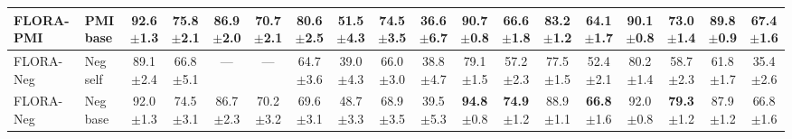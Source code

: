 \documentclass[10pt]{article}
\newcommand{\stdv}[1]{{\tiny$\pm$#1}}
\begin{document}
\begin{center}
{\begin{tabular}{ll cccc cccc cccc cccc}
FLORA-PMI & PMI base & 92.6\stdv{1.3} & 75.8\stdv{2.1} & 86.9\stdv{2.0} & 70.7\stdv{2.1} & 80.6\stdv{2.5} & 51.5\stdv{4.3} & 74.5\stdv{3.5} & 36.6\stdv{6.7} & 90.7\stdv{0.8} & 66.6\stdv{1.8} & 83.2\stdv{1.2} & 64.1\stdv{1.7} & 90.1\stdv{0.8} & 73.0\stdv{1.4} & 89.8\stdv{0.9} & 67.4\stdv{1.6} \\
\midrule
FLORA-Neg & Neg self & 89.1\stdv{2.4} & 66.8\stdv{5.1} & --- & --- & 64.7\stdv{3.6} & 39.0\stdv{4.3} & 66.0\stdv{3.0} & 38.8\stdv{4.7} & 79.1\stdv{1.5} & 57.2\stdv{2.3} & 77.5\stdv{1.5} & 52.4\stdv{2.1} & 80.2\stdv{1.4} & 58.7\stdv{2.3} & 61.8\stdv{1.7} & 35.4\stdv{2.6} \\
FLORA-Neg & Neg base & 92.0\stdv{1.3} & 74.5\stdv{3.1} & 86.7\stdv{2.3} & 70.2\stdv{3.2} & 69.6\stdv{3.1} & 48.7\stdv{3.3} & 68.9\stdv{3.5} & 39.5\stdv{5.3} & \textbf{94.8}\stdv{0.8} & \textbf{74.9}\stdv{1.2} & 88.9\stdv{1.1} & \textbf{66.8}\stdv{1.6} & 92.0\stdv{0.8} & \textbf{79.3}\stdv{1.2} & 87.9\stdv{1.2} & 66.8\stdv{1.6} \\
\bottomrule
\end{tabular}}
\end{center}
\end{document}
